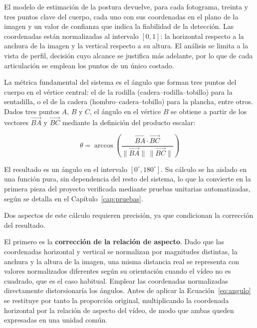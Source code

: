 \documentclass[12pt,a4paper,twoside,openright]{book}
\begin{document}
    El modelo de estimación de la postura devuelve, para cada fotograma, treinta y
    tres puntos clave del cuerpo, cada uno con sus coordenadas en el plano de la
    imagen y un valor de confianza que indica la fiabilidad de la detección. Las
    coordenadas están normalizadas al intervalo $[0,1]$: la horizontal respecto
    a la anchura de la imagen y la vertical respecto a su altura. El análisis se
    limita a la vista de perfil, decisión cuyo alcance se justifica más adelante,
    por lo que de cada articulación se emplean los puntos de un único costado.

    La métrica fundamental del sistema es el ángulo que forman tres puntos del
    cuerpo en el vértice central: el de la rodilla (cadera--rodilla--tobillo)
    para la sentadilla, o el de la cadera (hombro--cadera--tobillo) para la
    plancha, entre otros. Dados tres puntos $A$, $B$ y $C$, el ángulo en el
    vértice $B$ se obtiene a partir de los vectores $\vec{BA}$ y $\vec{BC}$
    mediante la definición del producto escalar:

    \begin{equation}
        \theta = \arccos\!\left(
            \frac{\vec{BA} \cdot \vec{BC}}
                 {\lVert \vec{BA} \rVert \, \lVert \vec{BC} \rVert}
        \right)
        \label{eq:angulo}
    \end{equation}

    El resultado es un ángulo en el intervalo $[0^\circ, 180^\circ]$. Su cálculo
    se ha aislado en una función pura, sin dependencia del resto del sistema, lo
    que la convierte en la primera pieza del proyecto verificada mediante pruebas
    unitarias automatizadas, según se detalla en el
    Capítulo~\ref{cap:pruebas}.

    Dos aspectos de este cálculo requieren precisión, ya que condicionan la
    corrección del resultado.

    El primero es la \textbf{corrección de la relación de aspecto}. Dado que las
    coordenadas horizontal y vertical se normalizan por magnitudes distintas, la
    anchura y la altura de la imagen, una misma distancia real se representa
    con valores normalizados diferentes según su orientación cuando el vídeo no
    es cuadrado, que es el caso habitual. Emplear las coordenadas normalizadas
    directamente distorsionaría los ángulos. Antes de aplicar la
    Ecuación~\ref{eq:angulo} se restituye por tanto la proporción original,
    multiplicando la coordenada horizontal por la relación de aspecto del vídeo,
    de modo que ambas queden expresadas en una unidad común.
\end{document}
